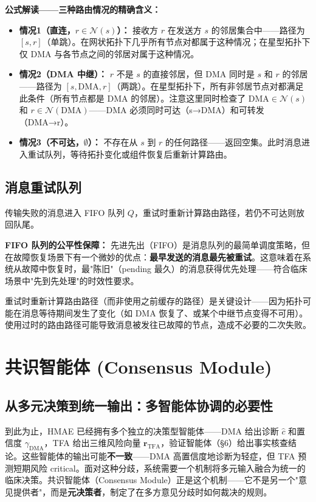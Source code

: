 \documentclass[11pt,a4paper]{ctexart}
\theoremstyle{remark}
\begin{document}
\textbf{公式解读——三种路由情况的精确含义：}
\begin{itemize}[nosep]
\item \textbf{情况1（直连，$r \in \mathcal{N}(s)$）：} 接收方 $r$ 在发送方 $s$ 的邻居集合中——路径为 $[s, r]$（单跳）。在网状拓扑下几乎所有节点对都属于这种情况；在星型拓扑下仅 DMA 与各节点之间的邻居对属于这种情况。
\item \textbf{情况2（DMA 中继）：} $r$ 不是 $s$ 的直接邻居，但 DMA 同时是 $s$ 和 $r$ 的邻居——路径为 $[s, \text{DMA}, r]$（两跳）。在星型拓扑下，所有非邻居节点对都满足此条件（所有节点都是 DMA 的邻居）。注意这里同时检查了 $\text{DMA} \in \mathcal{N}(s)$ 和 $r \in \mathcal{N}(\text{DMA})$——DMA 必须同时可达（s→DMA）和可转发（DMA→r）。
\item \textbf{情况3（不可达，$\emptyset$）：} 不存在从 $s$ 到 $r$ 的任何路径——返回空集。此时消息进入重试队列，等待拓扑变化或组件恢复后重新计算路由。
\end{itemize}

\subsection{消息重试队列}

传输失败的消息进入 FIFO 队列 $Q$，重试时重新计算路由路径，若仍不可达则放回队尾。

\textbf{FIFO 队列的公平性保障：} 先进先出（FIFO）是消息队列的最简单调度策略，但在故障恢复场景下有一个微妙的优点：\textbf{最早发送的消息最先被重试}。这意味着在系统从故障中恢复时，最"陈旧"（pending 最久）的消息获得优先处理——符合临床场景中"先到先处理"的时效性要求。

重试时重新计算路由路径（而非使用之前缓存的路径）是关键设计——因为拓扑可能在消息等待期间发生了变化（如 DMA 恢复了、或某个中继节点变得不可用）。使用过时的路由路径可能导致消息被发往已故障的节点，造成不必要的二次失败。

\section{共识智能体 (Consensus Module)}

\subsection{从多元决策到统一输出：多智能体协调的必要性}

到此为止，HMAE 已经拥有多个独立的决策型智能体——DMA 给出诊断 $\hat{c}$ 和置信度 $\gamma_{\text{DMA}}$，TFA 给出三维风险向量 $\mathbf{r}_{\text{TFA}}$，验证智能体（§6）给出事实核查结论。这些智能体的输出可能\textbf{不一致}——DMA 高置信度地诊断为轻症，但 TFA 预测短期风险 critical。面对这种分歧，系统需要一个机制将多元输入融合为统一的临床决策。共识智能体（Consensus Module）正是这个机制——它不是另一个"意见提供者"，而是\textbf{元决策者}，制定了在多方意见分歧时如何裁决的规则。
\end{document}
